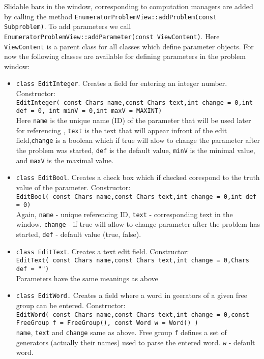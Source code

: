 \documentclass[12pt]{article}
\begin{document}
Slidable bars in the window,
corresponding to computation managers are
added by calling the method 
{\tt EnumeratorProblemView::addProblem(const Subproblem)}.
To add parameters we call
{\tt EnumeratorProblemView::add\-Parameter(const ViewContent)}.
Here {\tt ViewContent} is a parent class for all classes which define
   parameter objects. For now the following classes are available
for defining parameters in the problem window:
\begin{itemize}
\item {\tt class EditInteger}. Creates a field for entering an integer
number. Constructor:\\
   {\tt EditInteger( const Chars name,const Chars text,int change =
0,int def = 0, int minV = 0,int maxV = MAXINT)} \\
Here {\tt name} is the unique name (ID) of the parameter that will be
used later for
referencing , {\tt text} is the text that will appear infront of the
edit field,{\tt change} is a boolean which 
if true will alow to change the parameter
after the problem was started, {\tt def} is the default value,
   {\tt minV} is the minimal value, and {\tt maxV} is the maximal value.
\item {\tt class EditBool}. Creates a check box which if checked corespond
to the truth value of the parameter. Constructor: \\
{\tt  EditBool( const Chars name,const Chars text,int change = 0,int
def = 0)} \\
Again, {\tt name} - unique referencing ID, {\tt text} -
corresponding text in the
window, {\tt change} - if true will allow to change parameter after
the problem has started, {\tt def} - default value (true, false).
\item {\tt class EditText}. Creates a text edit field. Constructor: \\
{\tt EditText( const Chars name,const Chars text,int change =
0,Chars def = "")}\\
Parameters have the same meanings as above
\item {\tt class EditWord.} Creates a field where a word in geerators
of a given free group can be entered. Constructor: \\
{\tt EditWord( const Chars name,const Chars text,int change =
0,const FreeGroup f = FreeGroup(), const Word w = Word() )} \\
{\tt name}, {\tt text} and {\tt change} same as above. Free group {\tt f}
defines a set of generators (actually their names) used to parse the
entered word. {\tt w} - default word.

\end{itemize}
\end{document}
